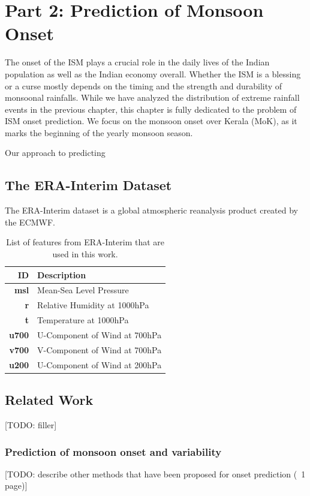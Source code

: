 \chapter{Part 2: Prediction of Monsoon Onset}
\label{c:part2}
The onset of the ISM plays a crucial role in the daily lives of the Indian population as well as the Indian economy overall. Whether the ISM is a blessing or a curse mostly depends on the timing and the strength and durability of monsoonal rainfalls. While we have analyzed the distribution of extreme rainfall events in the previous chapter, this chapter is fully dedicated to the problem of ISM onset prediction. We focus on the monsoon onset over Kerala (MoK), as it marks the beginning of the yearly monsoon season.

Our approach to predicting



\section{The ERA-Interim Dataset}
\label{st:era_interim}
The ERA-Interim dataset is a global atmospheric reanalysis product created by the ECMWF.

\begin{table}[h]
  \centering
  \begin{tabular}{rl}
    \toprule
    \textbf{ID} & \textbf{Description} \\
    \midrule
    \textbf{msl} & Mean-Sea Level Pressure \\
    \textbf{r} & Relative Humidity at 1000hPa \\
    \textbf{t} & Temperature at 1000hPa \\
    \textbf{u700} & U-Component of Wind at 700hPa \\
    \textbf{v700} & V-Component of Wind at 700hPa \\
    \textbf{u200} & U-Component of Wind at 200hPa \\
    \bottomrule
  \end{tabular}
  \caption{List of features from ERA-Interim that are used in this work.}
  \label{tab:era_features}
\end{table}

\section{Related Work}
[TODO: filler]


\subsection{Prediction of monsoon onset and variability}
\label{sst:related_prediction}
[TODO:  describe other methods that have been proposed for onset prediction (~1 page)]

